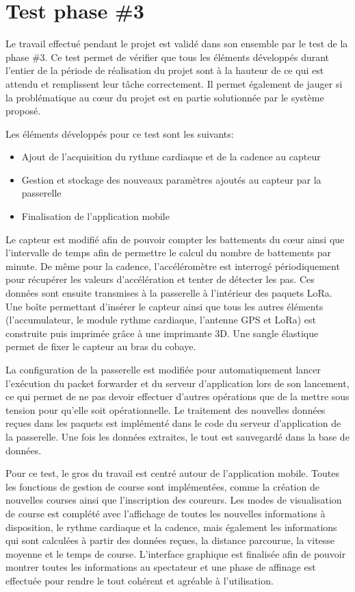 
\chapter{Test phase \#3}\label{ch:test_3}

Le travail effectué pendant le projet est validé dans son ensemble par le test de la phase \#3. Ce test permet de vérifier que tous les éléments développés durant l'entier de la période de réalisation du projet sont à la hauteur de ce qui est attendu et remplissent leur tâche correctement. Il permet également de jauger si la problématique au cœur du projet est en partie solutionnée par le système proposé.

Les éléments développés pour ce test sont les suivants:

\begin{itemize}
\item Ajout de l'acquisition du rythme cardiaque et de la cadence au capteur
\item Gestion et stockage des nouveaux paramètres ajoutés au capteur par la passerelle
\item Finalisation de l'application mobile
\end{itemize}

Le capteur est modifié afin de pouvoir compter les battements du cœur ainsi que l'intervalle de temps afin de permettre le calcul du nombre de battements par minute. De même pour la cadence, l'accéléromètre est interrogé périodiquement pour récupérer les valeurs d'accélération et tenter de détecter les pas. Ces données sont ensuite transmises à la passerelle à l'intérieur des paquets LoRa.
Une boîte permettant d'insérer le capteur ainsi que tous les autres éléments (l’accumulateur, le module rythme cardiaque, l'antenne GPS et LoRa) est construite puis imprimée grâce à une imprimante 3D. Une sangle élastique permet de fixer le capteur au bras du cobaye.

La configuration de la passerelle est modifiée pour automatiquement lancer l'exécution du packet forwarder et du serveur d'application lors de son lancement, ce qui permet de ne pas devoir effectuer d'autres opérations que de la mettre sous tension pour qu'elle soit opérationnelle.
Le traitement des nouvelles données reçues dans les paquets est implémenté dans le code du serveur d'application de la passerelle. Une fois les données extraites, le tout est sauvegardé dans la base de données.

Pour ce test, le gros du travail est centré autour de l'application mobile. Toutes les fonctions de gestion de course sont implémentées, comme la création de nouvelles courses ainsi que l'inscription des coureurs. Les modes de visualisation de course est complété avec l'affichage de toutes les nouvelles informations à disposition, le rythme cardiaque et la cadence, mais également les informations qui sont calculées à partir des données reçues, la distance parcourue, la vitesse moyenne et le temps de course. L'interface graphique est finalisée afin de pouvoir montrer toutes les informations au spectateur et une phase de affinage est effectuée pour rendre le tout cohérent et agréable à l'utilisation.


